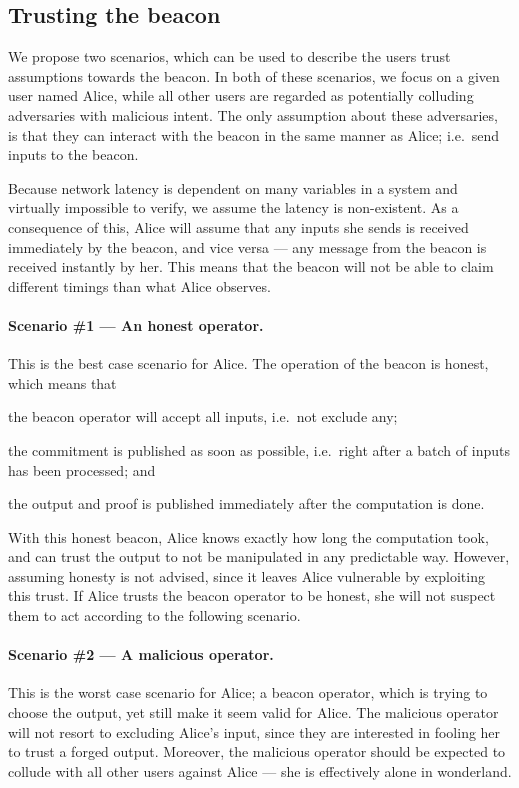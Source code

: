 \subsection{Trusting the beacon}%
\label{sub:trusting_the_beacon}

We propose two scenarios, which can be used to describe the users trust assumptions towards the beacon.
In both of these scenarios, we focus on a given user named Alice, while all other users are regarded as potentially colluding adversaries with malicious intent.
The only assumption about these adversaries, is that they can interact with the beacon in the same manner as Alice; i.e.\ send inputs to the beacon.

Because network latency is dependent on many variables in a system and virtually impossible to verify, we assume the latency is non-existent.
As a consequence of this, Alice will assume that any inputs she sends is received immediately by the beacon, and vice versa --- any message from the beacon is received instantly by her.
This means that the beacon will not be able to claim different timings than what Alice observes.

\paragraph{Scenario \#1 --- An honest operator.}
This is the best case scenario for Alice.
The operation of the beacon is honest, which means that
\begin{eletterate*}
\item the beacon operator will accept all inputs, i.e.\ not exclude any;
\item the commitment is published as soon as possible, i.e.\ right after a batch of inputs has been processed; and
\item the output and proof is published immediately after the computation is done.
\end{eletterate*}

With this honest beacon, Alice knows exactly how long the computation took, and can trust the output to not be manipulated in any predictable way.
However, assuming honesty is not advised, since it leaves Alice vulnerable by exploiting this trust.
If Alice trusts the beacon operator to be honest, she will not suspect them to act according to the following scenario.

\paragraph{Scenario \#2 --- A malicious operator.}
This is the worst case scenario for Alice; a beacon operator, which is trying to choose the output, yet still make it seem valid for Alice.
The malicious operator will not resort to excluding Alice's input, since they are interested in fooling her to trust a forged output.
Moreover, the malicious operator should be expected to collude with all other users against Alice --- she is effectively alone in wonderland.


